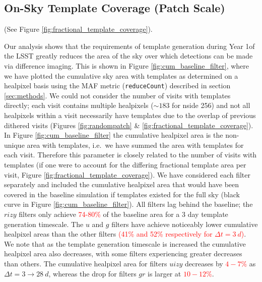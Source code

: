 \documentclass[preprint,linenumbers]{aastex631}
\providecommand{\red}[1]{\textcolor{red}{#1}}
\begin{document}
{		%
		
		
		
		\subsection{On-Sky Template Coverage (Patch Scale)}
		\label{sec:template_coverage}
		
		(See Figure \ref{fig:fractional_template_coverage}).
		
		Our analysis shows that the requirements of template generation during Year 1of the LSST greatly reduces the area of the sky over which detections can be made via difference imaging.
		This is shown in Figure \ref{fig:cum_baseline_filter}, where we have plotted the cumulative sky area with templates as determined on a healpixel basis using the MAF metric (\verb|reduceCount|) described in section \ref{sec:methods}.
		We could not consider the number of visits with templates directly; each visit contains multiple healpixels ($\sim183$ for nside 256) and not all healpixels within a visit necessarily have templates due to the overlap of previous dithered visits (Figures \ref{fig:randompatch} \& \ref{fig:fractional_template_coverage}). %
		In Figure \ref{fig:cum_baseline_filter} the cumulative healpixel area is the non-unique area with templates, i.e.\ we have summed the area with templates for each visit.
		Therefore this parameter is closely related to the number of visits with templates (if one were to account for the differing fractional template area per visit, Figure \ref{fig:fractional_template_coverage}).
		We have considered each filter separately and included the cumulative healpixel area that would have been covered in the baseline simulation if templates existed for the full sky (black curve in Figure \ref{fig:cum_baseline_filter}).
		All filters lag behind the baseline; the $rizy$ filters only achieve \red{74-80\%} of the baseline area for a 3 day template generation timescale.
		The $u$ and $g$ filters have achieve noticeably lower cumulative healpixel areas than the other filters \red{(41\% and 52\% respectively for $\Delta t = 3\ \si{d}$)}.
		We note that as the template generation timescale is increased the cumulative healpixel area also decreases, with some filters experiencing greater decreases than others.
		The cumulative healpixel area for filters $uizy$ decreases by \red{$4-7\%$} as $\Delta t = 3 \rightarrow 28\ \si{d}$, whereas the drop for filters $gr$ is larger at \red{$10 - 12 \%$}.
		
}
\end{document}
